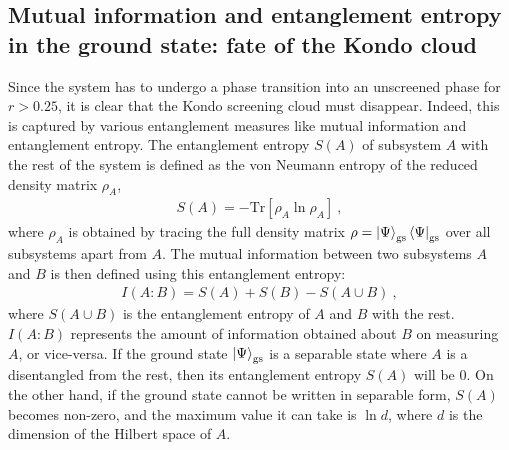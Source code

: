 \documentclass[reprint,superscriptaddress,floatfix]{revtex4-2}
\begin{document}
\subsection{Mutual information and entanglement entropy in the ground state: fate of the Kondo cloud}
Since the system has to undergo a phase transition into an unscreened phase for \(r > 0.25\), it is clear that the Kondo screening cloud must disappear. Indeed, this is captured by various entanglement measures like mutual information and entanglement entropy. The entanglement entropy \(S(A)\) of subsystem \(A\) with the rest of the system is defined as the von Neumann entropy of the reduced density matrix \(\rho_A\),
\begin{equation}\begin{aligned}
	S(A) = -\text{Tr}\left[\rho_A \ln \rho_A\right]~,
\end{aligned}\end{equation}
where \(\rho_A\) is obtained by tracing the full density matrix \(\rho = \ket{\Psi}_\text{gs} \bra{\Psi}_\text{gs}\) over all subsystems apart from \(A\). The mutual information between two subsystems \(A\) and \(B\) is then defined using this entanglement entropy:
\begin{equation}\begin{aligned}
	I(A:B) = S(A) + S(B) - S(A \cup B)~,
\end{aligned}\end{equation}
where \(S(A \cup B)\) is the entanglement entropy of \(A\) and \(B\) with the rest. \(I(A:B)\) represents the amount of information obtained about \(B\) on measuring \(A\), or vice-versa. If the ground state \(\ket{\Psi}_\text{gs}\) is a separable state where \(A\) is a disentangled from the rest, then its entanglement entropy \(S(A)\) will be \(0\). On the other hand, if the ground state cannot be written in separable form, \(S(A)\) becomes non-zero, and the maximum value it can take is \(\ln d\), where \(d\) is the dimension of the Hilbert space of \(A\). 
\end{document}
